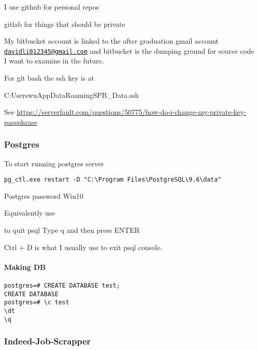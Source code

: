 I use github for personal repos

gitlab for things that should be private

My bitbucket account is linked to the after graduation gmail account
\href{mailto:davidli012345@gmail.com}{\nolinkurl{davidli012345@gmail.com}}
and bitbucket is the dumping ground for source code I want to examine in
the future.

For git bash the ssh key is at

C:UserswuAppDataRoamingSPB\_Data.ssh

See
\url{https://serverfault.com/questions/50775/how-do-i-change-my-private-key-passphrase}


\subsubsection{Postgres}\label{postgres}

To start running postgres server

\begin{verbatim}
pg_ctl.exe restart -D "C:\Program Files\PostgreSQL\9.6\data"
\end{verbatim}

Postgres password Win10

\begin{Shaded}
   \NormalTok{;}
\end{Shaded}

Equivalently use

\begin{Shaded}
\OperatorTok{=}
\end{Shaded}

to quit psql Type q and then press ENTER

Ctrl + D is what I usually use to exit psql console.


\paragraph{Making DB}\label{making-db}

\begin{verbatim}
postgres=# CREATE DATABASE test;
CREATE DATABASE
postgres=# \c test 
\dt 
\q
\end{verbatim}


\subsubsection{Indeed-Job-Scrapper}\label{indeed-job-scrapper}

